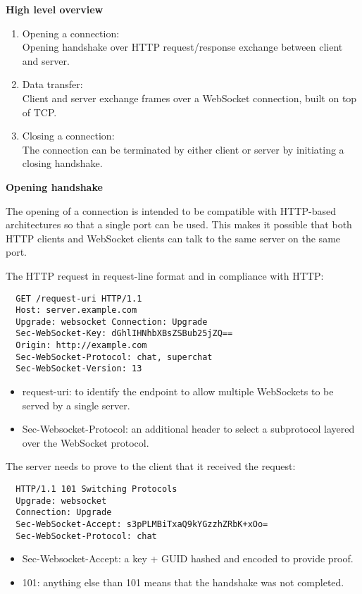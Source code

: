 \textbf{High level overview}

\begin{enumerate}
  \item Opening a connection: \\ Opening handshake over HTTP request/response exchange between client and server.
  \item Data transfer: \\ Client and server exchange frames over a WebSocket connection, built on top of TCP.
  \item Closing a connection: \\ The connection can be terminated by either client or server by initiating a closing handshake.
\end{enumerate}

\textbf{Opening handshake}

The opening of a connection is intended to be compatible with HTTP-based architectures so that a single port can be used. This makes it possible that both HTTP clients and WebSocket clients can talk to the same server on the same port. \cite{ws-rfc}

The HTTP request in request-line format and in compliance with HTTP:
\begin{verbatim}
  GET /request-uri HTTP/1.1 
  Host: server.example.com 
  Upgrade: websocket Connection: Upgrade 
  Sec-WebSocket-Key: dGhlIHNhbXBsZSBub25jZQ== 
  Origin: http://example.com 
  Sec-WebSocket-Protocol: chat, superchat 
  Sec-WebSocket-Version: 13  
\end{verbatim}

\begin{itemize}
  \item request-uri:  to identify the endpoint to allow multiple WebSockets to be served by a single server.
  \item Sec-Websocket-Protocol: an additional header to select a subprotocol layered over the WebSocket protocol.
\end{itemize}

The server needs to prove to the client that it received the request:
\begin{verbatim}
  HTTP/1.1 101 Switching Protocols
  Upgrade: websocket
  Connection: Upgrade
  Sec-WebSocket-Accept: s3pPLMBiTxaQ9kYGzzhZRbK+xOo=
  Sec-WebSocket-Protocol: chat
\end{verbatim}

\begin{itemize}
  \item Sec-Websocket-Accept: a key + GUID hashed and encoded to provide proof.
  \item 101: anything else than 101 means that the handshake was not completed.
\end{itemize}

